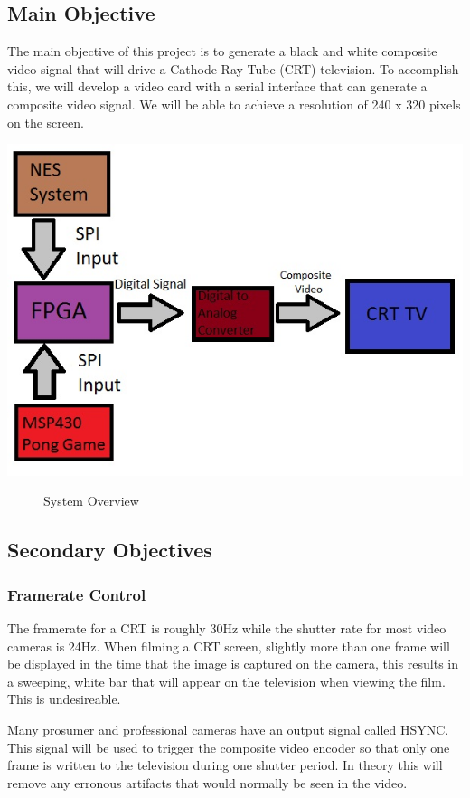\subsection*{Main Objective}

The main objective of this project is to generate a black and white composite
video signal that will drive a Cathode Ray Tube (CRT) television. To accomplish
this, we will develop a video card with a serial interface that can generate a
composite video signal. We will be able to achieve a resolution of 240 x 320
pixels on the screen.

\includegraphics{Diagram}
\begin{figure}[H]
   \centering
   \caption{System Overview}
\end{figure}

\subsection*{Secondary Objectives}

\subsubsection*{Framerate Control}

The framerate for a CRT is roughly 30Hz while the shutter rate for most video
cameras is 24Hz. When filming a CRT screen, slightly more than one frame will be
displayed in the time that the image is captured on the camera, this results in
a sweeping, white bar that will appear on the television when viewing the film.
This is undesireable.

Many prosumer and professional cameras have an output signal called HSYNC. This
signal will be used to trigger the composite video encoder so that only one
frame is written to the television during one shutter period. In theory this
will remove any erronous artifacts that would normally be seen in the video.

